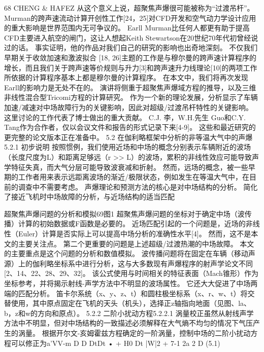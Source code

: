 \documentclass[UTF8,11pt,a4paper,openany,fontset=fandol]{ctexbook}
\begin{document}
68 CHENG \& HAFEZ 从这个意义上说，超聚焦声爆很可能被称为“过渡吊杆”。 Murman的跨声速流动计算开创性工作[24，25]对CFD开发和空气动力学设计应用的重大影响是世界范围内无可争议的。 Earll Murman比任何人都更有助于提高CFD主要进入航空的闸门，这让人想起Keith Stewartson在20世纪70年代初曾经说过的话。 事实证明，他的作品对我们自己的研究的影响也出奇地深刻。 不仅我们早期关于收敛加速和激波拟合 [18, 26]主题的工作是与穆尔曼的跨声速计算程序的增长，而且我们关于跨声速等价规则与升力[3]和跨声速升力线理论[10]的两项工作所依据的计算程序基本上都是穆尔曼的计算程序。 在本文中，我们将再次发现Earll的影响力是无处不在的。 演讲将侧重于超聚焦声爆域方程的推导，以及三维非线性混合型Tricomi方程的计算研究。 作为一个新的理论发展，分析显示了车辆加速/减速对中场故障行为的关键影响，因此对超级/过渡吊杆特性的关键影响。 这里讨论的工作代表了博士做出的重大贡献。 C.J. 李，W.H.先生 Guo和C.Y. Tang作为合作者，仅以会议文件和报告的形式记录下来[4-9]。 这些和最近研究的更完整的论文版本正在准备中。 5.2 在伽利略框架中分析的非等温大气中的声爆 5.2.1 初步说明 按照惯例，我们使用近场和中场的概念分别表示车辆附近的波场（长度尺度为L）和距离足够远（r >> L）的波场，累积的非线性效应可能导致声学特征失真，而大气分层可能导致波衰减和折射。 然而，远场的概念，被一些早期的工作者用来表示远距离波场的渐近/极限状态，例如发生在等温大气中，在目前的调查中不需要考虑。 声爆理论和预测方法的核心是对中场结构的分析。 简化了接近飞机时中场故障的分析，与近场结构的适当匹配

超聚焦声爆问题的分析和模拟69图1 超聚焦声爆问题的坐标对于确定中场（波传播）计算的初始数据或F函数是必要的。 近场匹配引起的一个问题是，近场的非线性（Euler）计算是否实际上可以提高中场分析的准确性水平[4]。 然而，这不是本文的主要关注点。 第二个更重要的问题是上述超级/过渡热潮的中场故障。 本文的主要重点是这个问题的分析和数值模拟。 波传播问题将在固定在车辆（移动声源）上的伽利略坐标系中进行分析，这与大多数现有声爆程序的射声学论文不同[2、14、22、28、29、32]。 该公式使用与时间相关的特征表面（Mach锥形）作为坐标参考，并将揭示射线-声学方法中不明显的波场属性。 它还大大促进了中场两端的匹配分析。 笛卡尔系统（x、y、z、t）和圆柱极坐标系（x、r、w、t）将交替使用，其中原点固定在飞机的天头（机头），选择正z轴指向地面（见图、la、b，z和w的方向和原点）。 5.2.2 二阶小扰动方程5.2.2.1 涡量校正虽然从射线声学方法中不明显，但对中场结构的一致描述必须解释在大气熵不均匀的情况下气压产生的涡量。 根据开尔文-亥姆霍兹方程确定的一阶涡量，控制中场的二阶小扰动方程可以修正为a'VV-m D D DtDt • + H0 Dt |W|2 + 7-1 2a 2 D (5.1)
\end{document}
